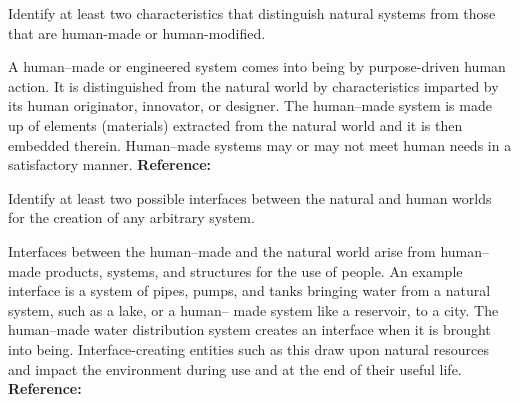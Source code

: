 \begin{exercises}
    \begin{exercise}
    \label{sea-02-01}
        Identify at least two characteristics that distinguish natural systems from those that are human-made or human-modified.
    \end{exercise}
    \begin{solution}
        A human–made or engineered system comes into being by purpose-driven human action. It is distinguished from the natural world by characteristics imparted by its human originator, innovator, or designer. The human–made system is made up of elements (materials) extracted from the natural world and it is then embedded therein. Human–made systems may or may not meet human needs in a satisfactory manner. \textbf{Reference:}
    \end{solution}
    
    \begin{exercise}
    \label{sea-02-02}
        Identify at least two possible interfaces between the natural and human worlds for the creation of any arbitrary system.
    \end{exercise}
    \begin{solution}
        Interfaces between the human–made and the natural world arise from human–made products, systems, and structures for the use of people. An example interface is a system of pipes, pumps, and tanks bringing water from a natural system, such as a lake, or a human– made system like a reservoir, to a city. The human–made water distribution system creates an interface when it is brought into being. Interface-creating entities such as this draw upon natural resources and impact the environment during use and at the end of their useful life. \textbf{Reference:}
    \end{solution}
    

\end{exercises}
